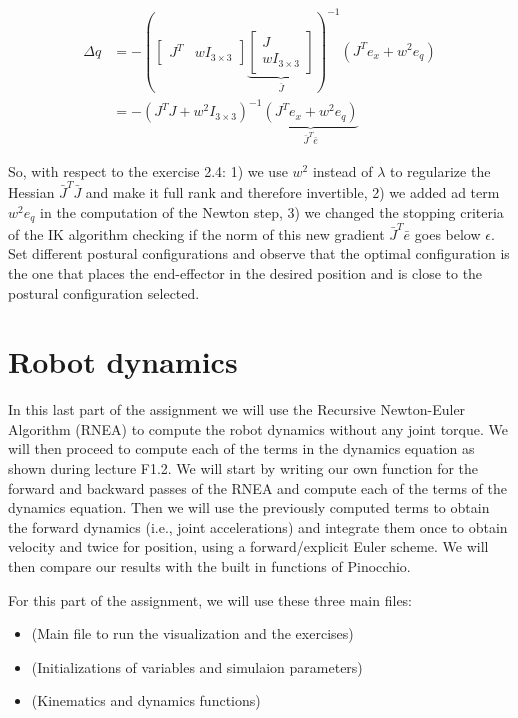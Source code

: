 \documentclass[11pt]{article}
\newcommand{\mat}[1]{\ensuremath{\begin{bmatrix}#1\end{bmatrix}}}	%
\begin{document}
\begin{align*}
\Delta q &= -\left( \mat { J^T &  wI_{3 \times 3} } \underbrace{ \mat{J  \\ wI_{3 \times 3}}}_{\bar{J}} \right)^{-1} \left(J^T e_x + w^2e_q \right) \\
&= -\left( J^TJ + w^2I_{3 \times 3}\right)^{-1} \underbrace{ \left(J^T e_x + w^2 e_q \right) }_{\bar{J}^T\bar{e}}
\end{align*}


So, with respect to the exercise 2.4: 1) we use $w^2$ instead of $\lambda $ to regularize the Hessian $\bar{J}^T\bar{J}$ and make it full rank and therefore invertible, 2) we added ad term $w^2 e_q $ in the computation of the Newton step, 3) we changed the stopping criteria of the IK algorithm checking if the norm of this new gradient $\bar{J}^T\bar{e}$ goes below $\epsilon$.
Set different postural configurations and observe that the optimal configuration is the one that places the end-effector in the desired position and is close to the postural  configuration selected.
\\

\section{Robot dynamics}

In this last part of the assignment we will use the Recursive Newton-Euler Algorithm (RNEA) to compute the robot dynamics without any joint torque. We will then proceed to compute each of the terms in the dynamics equation as shown during lecture F1.2.  We will start by writing our own function for the forward and backward passes of the RNEA and compute each of the terms of the dynamics equation. Then we will use the previously computed terms to obtain the forward dynamics (i.e., joint accelerations) and integrate them once to obtain velocity and twice  for position, using a forward/explicit Euler scheme. We will then compare our results with the built in functions of Pinocchio.





For this part of the assignment, we will use these three main files: 
\begin{itemize}
	\item {} (Main file to run the visualization and the exercises)
	\item {} (Initializations of variables and simulaion parameters)
	\item {} (Kinematics and dynamics functions)
\end{itemize}
\end{document}
